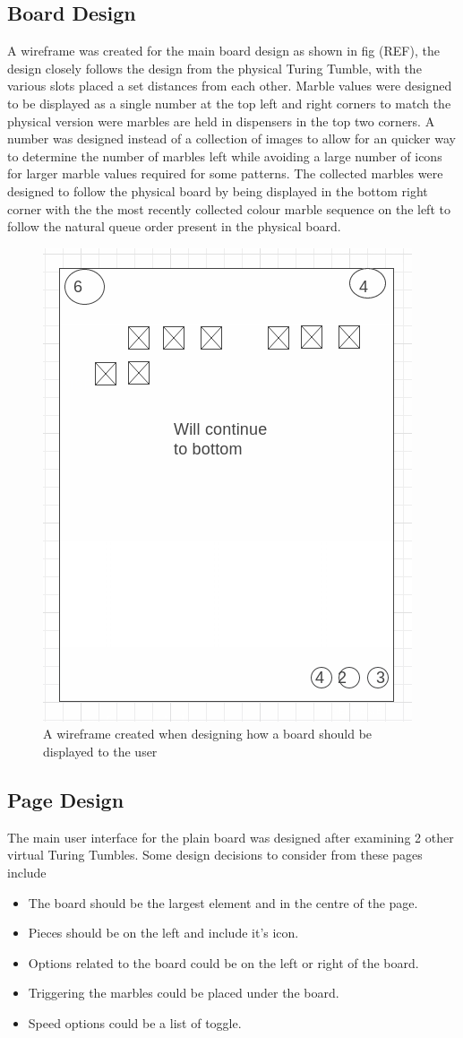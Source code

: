 \documentclass{l4proj}
\begin{document}
\subsection{Board Design}
A wireframe was created for the main board design as shown in fig (REF), the design closely follows the design from the physical Turing Tumble, with the various slots placed a set distances from each other. Marble values were designed to be displayed as a single number at the top left and right corners to match the physical version were marbles are held in dispensers in the top two corners. A number was designed instead of a collection of images to allow for an quicker way to determine the number of marbles left while avoiding a large number of icons for larger marble values required for some patterns. The collected marbles were designed to follow the physical board by being displayed in the bottom right corner with the the most recently collected colour marble sequence on the left to follow the natural queue order present in the physical board.

\begin{figure}
    \centering
    \includegraphics[width=0.5\linewidth]{images/boardWireframe.png}
    \caption{A wireframe created when designing how a board should be displayed to the user}
    \label{fig:boardWireframe}
\end{figure}

\subsection{Page Design}
The main user interface for the plain board was designed after examining 2 other virtual Turing Tumbles. Some design decisions to consider from these pages include
\begin{itemize}
    \item The board should be the largest element and in the centre of the page.
    \item Pieces should be on the left and include it's icon.
    \item Options related to the board could be on the left or right of the board.
    \item Triggering the marbles could be placed under the board.
    \item Speed options could be a list of toggle.
\end{itemize}
\end{document}
